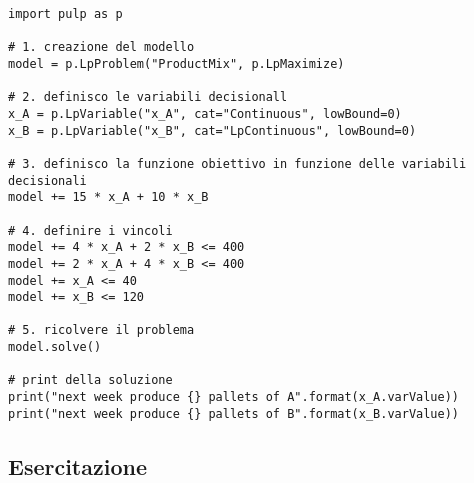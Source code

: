 \begin{lstlisting}
import pulp as p

# 1. creazione del modello
model = p.LpProblem("ProductMix", p.LpMaximize)

# 2. definisco le variabili decisionall
x_A = p.LpVariable("x_A", cat="Continuous", lowBound=0)
x_B = p.LpVariable("x_B", cat="LpContinuous", lowBound=0)

# 3. definisco la funzione obiettivo in funzione delle variabili decisionali
model += 15 * x_A + 10 * x_B

# 4. definire i vincoli
model += 4 * x_A + 2 * x_B <= 400
model += 2 * x_A + 4 * x_B <= 400
model += x_A <= 40
model += x_B <= 120

# 5. ricolvere il problema
model.solve()

# print della soluzione
print("next week produce {} pallets of A".format(x_A.varValue))
print("next week produce {} pallets of B".format(x_B.varValue))
\end{lstlisting}


\subsection{Esercitazione}

